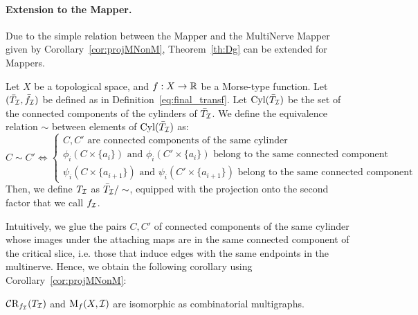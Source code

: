 \paragraph*{Extension to the Mapper.} Due to the simple relation between the Mapper and the MultiNerve Mapper
given by Corollary~\ref{cor:projMNonM}, Theorem~\ref{th:Dg} can be extended for Mappers. 

\begin{defin}\label{cor:finaltransfMapper}
Let $X$ be a topological space, and $f:X\rightarrow\mathbb{R}$ be a Morse-type function. 
Let $(\bar T_{\mathcal I},\bar f_{\mathcal I})$ be defined as in Definition~\ref{eq:final_transf}.
Let ${\rm Cyl}(\bar T_{\mathcal I})$ be the set of the connected components of the cylinders of $\bar T_{\mathcal I}$. 
We define the equivalence relation
$\sim$ between elements of ${\rm Cyl}(\bar T_{\mathcal I})$ as: $$C\sim C'\Leftrightarrow \left\{\begin{array}{l} C,C'\text{ are connected components of the same cylinder} \\ 
\phi_i(C\times\{a_i\})\text{ and }\phi_i(C'\times\{a_i\})\text{ belong to the same connected component}\\
\psi_i(C\times\{a_{i+1}\})\text{ and }\psi_i(C'\times\{a_{i+1}\})\text{ belong to the same connected component} \end{array}\right.$$
Then, we define $T_{\mathcal I}$ as $\bar T_{\mathcal I}/\sim$, equipped with the projection onto 
the second factor that we call $f_{\mathcal I}$.
\end{defin}

Intuitively, we glue the pairs $C,C'$ of connected components of the same cylinder whose images under the attaching maps are in the same connected component of the critical slice, 
i.e. those that induce edges with the same endpoints in the multinerve. Hence, we obtain the following corollary using Corollary~\ref{cor:projMNonM}:

\begin{cor}\label{cor:transfMapper}
$\mathcal C\mathrm{R}_{f_{\mathcal I}}(T_{\mathcal I})$ and $\mathrm{M}_f(X,\mathcal{I})$ are isomorphic as combinatorial multigraphs.   
\end{cor}

    










